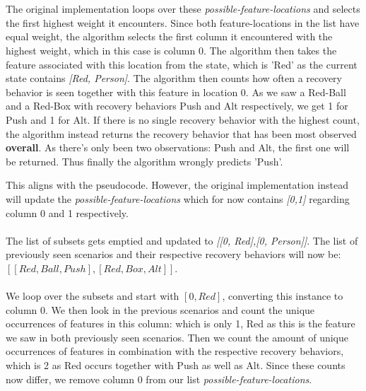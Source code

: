 \documentclass{article}
\begin{document}
\\\\
The original implementation loops over these \textit{possible-feature-locations} and selects the first highest weight it encounters. Since both feature-locations in the list have equal weight, the algorithm selects the first column it encountered with the highest weight, which in this case is column 0. The algorithm then takes the feature associated with this location from the state, which is 'Red' as the current state contains \textit{[Red, Person]}. The algorithm then counts how often a recovery behavior is seen together with this feature in location 0. As we saw a Red-Ball and a Red-Box with recovery behaviors Push and Alt respectively, we get 1 for Push and 1 for Alt. If there is no single recovery behavior with the highest count, the algorithm instead returns the recovery behavior that has been most observed \textbf{overall}. As there's only been two observations: Push and Alt, the first one will be returned. Thus finally the algorithm wrongly predicts 'Push'.
\begin{quote}
\textit{}
\end{quote}
This aligns with the pseudocode. However, the original implementation instead will update the \textit{possible-feature-locations} which for now contains \textit{[0,1]} regarding column 0 and 1 respectively. 
\\\\
The list of subsets gets emptied and updated to \textit{[[0, Red],[0, Person]]}. The list of previously seen scenarios and their respective recovery behaviors will now be: $[[Red, Ball, Push],[Red, Box, Alt]]$.
\\\\
We loop over the subsets and start with $[0, Red]$, converting this instance to column 0. We then look in the previous scenarios and count the unique occurrences of features in this column: which is only 1, Red as this is the feature we saw in both previously seen scenarios. Then we count the amount of unique occurrences of features in combination with the respective recovery behaviors, which is 2 as Red occurs together with Push as well as Alt. Since these counts now differ, we remove column 0 from our list \textit{possible-feature-locations}. 
\\\\
\end{document}

